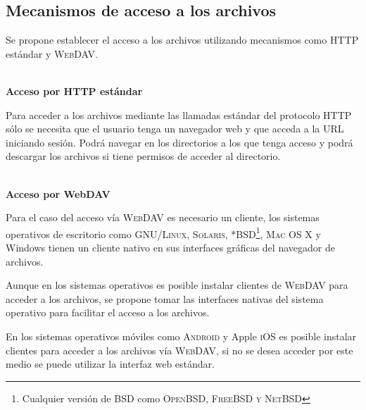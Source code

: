 \newpage
      \subsection {Mecanismos de acceso a los archivos}

Se propone establecer el acceso a los archivos utilizando mecanismos como \textsc{\gls{HTTP}} est\'{a}ndar y \textsc{\gls{WebDAV}}.


          \textbf{\\ Acceso por HTTP est\'{a}ndar \\}

Para acceder a los archivos mediante las llamadas est\'{a}ndar del protocolo \textsc{\gls{HTTP}} s\'{o}lo se necesita que el usuario tenga un navegador web y que acceda a la \textsc{\gls{URL}} iniciando sesi\'{o}n. Podr\'{a} navegar en los directorios a los que tenga acceso y podr\'{a} descargar los archivos si tiene permisos de acceder al directorio.

          \textbf{\\ Acceso por WebDAV \\}

Para el caso del acceso v\'{i}a \textsc{\gls{WebDAV}} es necesario un cliente, los sistemas operativos de escritorio como \textsc{GNU/Linux}, \textsc{Solaris}, \textsc{*BSD\footnote{Cualquier versi\'{o}n de BSD como \textsc{OpenBSD, FreeBSD y NetBSD}}}, \textsc{Mac OS X} y Windows tienen un cliente nativo en sus interfaces gr\'{a}ficas del navegador de archivos.

Aunque en los sistemas operativos es posible instalar clientes de \textsc{\gls{WebDAV}} para acceder a los archivos, se propone tomar las interfaces nativas del sistema operativo para facilitar el acceso a los archivos.

En los sistemas operativos m\'{o}viles como \textsc{Android} y Apple \textsc{iOS} es posible instalar clientes para acceder a los archivos v\'{i}a \textsc{\gls{WebDAV}}, si no se desea acceder por este medio se puede utilizar la interfaz web est\'{a}ndar.

